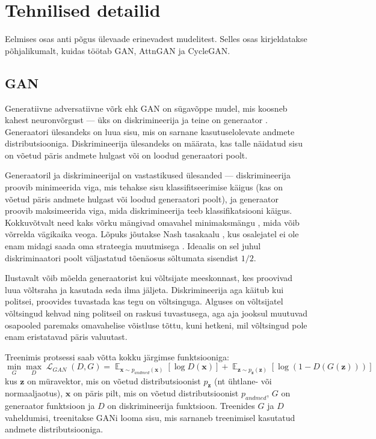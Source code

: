 \documentclass{vilgym}
\DeclareMathOperator{\EX}{\mathbb{E}}
\DeclareMathOperator{\loss}{\mathcal{L}}
\begin{document}
	\section{Tehnilised detailid}
	Eelmises osas anti põgus ülevaade erinevadest mudelitest. Selles osas kirjeldatakse põhjalikumalt, kuidas töötab GAN, AttnGAN ja CycleGAN.

	\subsection{GAN}
	Generatiivne adversatiivne võrk ehk GAN  on sügavõppe mudel, mis koosneb kahest neuronvõrgust --- üks on diskrimineerija  ja teine on generaator .  Generaatori ülesandeks on luua sisu, mis on sarnane kasutuselolevate andmete distributsiooniga. Diskrimineerija ülesandeks on määrata, kas talle näidatud sisu on võetud päris andmete hulgast või on loodud generaatori poolt.
	
	Generaatoril ja diskrimineerijal on vastastikused ülesanded --- diskrimineerija proovib minimeerida viga, mis tehakse sisu klassifitseerimise käigus (kas on võetud päris andmete hulgast või loodud generaatori poolt), ja generaator proovib maksimeerida viga, mida diskrimineerija teeb klassifikatsiooni käigus. Kokkuvõtvalt need kaks võrku mängivad omavahel minimaksmängu , mida võib võrrelda vägikaika veoga. Lõpuks jõutakse Nash tasakaalu , kus osalejatel ei ole enam midagi saada oma strateegia muutmisega \parencite{gametheory}. Ideaalis on sel juhul diskriminaatori poolt väljastatud tõenäosus sõltumata sisendist $ 1/2 $.

	Ilustavalt võib mõelda generaatorist kui võltsijate meeskonnast, kes proovivad luua võltsraha ja kasutada seda ilma jäljeta. Diskrimineerija aga käitub kui politsei, proovides tuvastada kas tegu on võltsinguga. Alguses on võltsijatel võltsingud kehvad ning politseil on raskusi tuvastusega, aga aja jooksul muutuvad osapooled paremaks omavahelise võistluse tõttu, kuni hetkeni, mil võltsingud pole enam eristatavad päris valuutast.

	Treenimis protsessi saab võtta kokku järgimse funktsiooniga:
	\begin{equation} \label{eq:gan}
		\operatorname*{min}_G \operatorname*{max}_D \loss_{GAN}(D,G) = \EX_{\boldsymbol{x}\sim p_{andmed}(\boldsymbol{x})}[\log D(\boldsymbol{x})] + \EX_{\boldsymbol{z}\sim p_{\boldsymbol{z}}(\boldsymbol{z})}[\log(1-D(G(\boldsymbol{z})))]
	\end{equation}
	kus $ \boldsymbol{z} $ on müravektor, mis on võetud distributsioonist $ p_{\boldsymbol{z}} $ (nt ühtlane- või normaaljaotus), $ \boldsymbol{x} $ on päris pilt, mis on võetud distributsioonist $ p_{andmed} $, $ G $ on generaator funktsioon ja $ D $ on diskrimineerija funktsioon.  Treenides $ G $ ja $ D $ vaheldumisi, treenitakse GANi looma sisu, mis sarnaneb treenimisel kasutatud andmete distributsiooniga. \parencite{gan}
\end{document}
